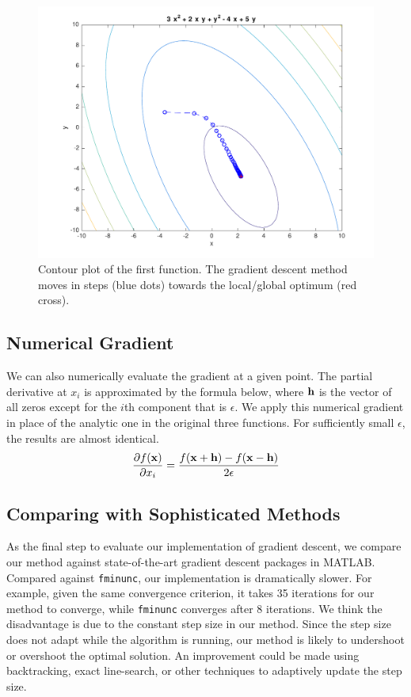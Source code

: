 \begin{figure}[h!]
\centering
\includegraphics[scale=0.4]{hw1_1.pdf}
\caption{Contour plot of the first function. The gradient descent method moves in steps (blue dots) towards the local/global optimum (red cross).}
\end{figure}


\subsection{Numerical Gradient}
We can also numerically evaluate the gradient at a given point. The partial derivative at $x_i$ is approximated by the formula below, where $\boldsymbol{\mathbf{h}}$ is the vector of all zeros except for the $i$th component that is $\epsilon$.  We apply this numerical gradient in place of the analytic one in the original three functions.  For sufficiently small $\epsilon$, the results are almost identical.
%
\begin{equation}
\frac{\partial f(\boldsymbol{\mathbf{x}})}{\partial x_i} = \frac{f(\boldsymbol{\mathbf{x}}+\boldsymbol{\mathbf{h}}) - f(\boldsymbol{\mathbf{x}}-\boldsymbol{\mathbf{h}})}{2\epsilon}
\end{equation}

\subsection{Comparing with Sophisticated Methods}
As the final step to evaluate our implementation of gradient descent, we compare our method against state-of-the-art gradient descent packages in MATLAB.  Compared against \texttt{fminunc}, our implementation is dramatically slower. For example, given the same convergence criterion, it takes 35 iterations for our method to converge, while \texttt{fminunc} converges after 8 iterations.  We think the disadvantage is due to the constant step size in our method. Since the step size does not adapt while the algorithm is running, our method is likely to undershoot or overshoot the optimal solution. An improvement could be made using backtracking, exact line-search, or other techniques to adaptively update the step size.  